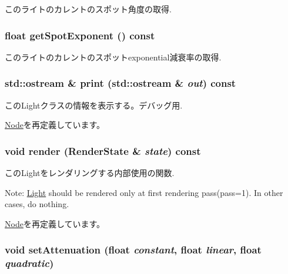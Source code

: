 このライトのカレントのスポット角度の取得. \hypertarget{classm3g_1_1Light_a359fee191741efb7e576616a59a76f7}{
\subsubsection[{getSpotExponent}]{\setlength{\rightskip}{0pt plus 5cm}float getSpotExponent () const}}
\label{classm3g_1_1Light_a359fee191741efb7e576616a59a76f7}


このライトのカレントのスポットexponential減衰率の取得. \hypertarget{classm3g_1_1Light_6fea17fa1532df3794f8cb39cb4f911f}{
\subsubsection[{print}]{\setlength{\rightskip}{0pt plus 5cm}std::ostream \& print (std::ostream \& {\em out}) const}}
\label{classm3g_1_1Light_6fea17fa1532df3794f8cb39cb4f911f}


このLightクラスの情報を表示する。デバッグ用. 

\hyperlink{classm3g_1_1Node_6fea17fa1532df3794f8cb39cb4f911f}{Node}を再定義しています。\hypertarget{classm3g_1_1Light_8babc8a79b78615da51161e94029eea9}{
\subsubsection[{render}]{\setlength{\rightskip}{0pt plus 5cm}void render ({\bf RenderState} \& {\em state}) const}}
\label{classm3g_1_1Light_8babc8a79b78615da51161e94029eea9}


このLightをレンダリングする内部使用の関数.

Note: \hyperlink{classm3g_1_1Light}{Light} should be rendered only at first rendering pass(pass=1). In other cases, do nothing. 

\hyperlink{classm3g_1_1Node_8babc8a79b78615da51161e94029eea9}{Node}を再定義しています。\hypertarget{classm3g_1_1Light_391c5cff137fc2e810f5129a5381196f}{
\subsubsection[{setAttenuation}]{\setlength{\rightskip}{0pt plus 5cm}void setAttenuation (float {\em constant}, \/  float {\em linear}, \/  float {\em quadratic})}}
\label{classm3g_1_1Light_391c5cff137fc2e810f5129a5381196f}


